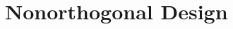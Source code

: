 \documentclass[11pt,fleqn]{book} %
\begin{document}








\chapter{Nonorthogonal Design}
\end{document}

